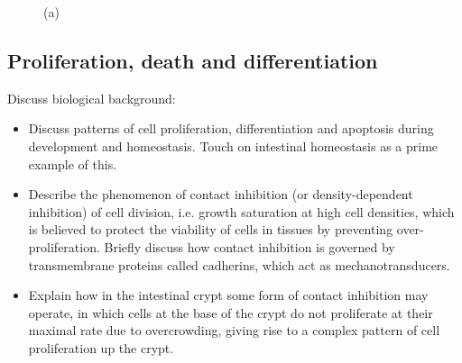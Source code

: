 \documentclass{article}
\begin{document}
\begin{figure}
{\label{fig:CellSorting:e}
}
\caption{(a)}
\label{fig:CellSorting}
\end{figure}


\subsection{Proliferation, death and differentiation} \label{sec:proliferation}

Discuss biological background:
\begin{itemize}
\item Discuss patterns of cell proliferation, differentiation and apoptosis during development and homeostasis. Touch on intestinal homeostasis as a prime example of this.
\item Describe the phenomenon of contact inhibition (or density-dependent inhibition) of cell division, i.e. growth saturation at high cell densities, which is believed to protect the viability of cells in tissues by preventing over-proliferation. Briefly discuss how contact inhibition is governed by transmembrane proteins called cadherins, which act as mechanotransducers.
\item Explain how in the intestinal crypt some form of contact inhibition may operate, in which cells at the base of the crypt do not proliferate at their maximal rate due to overcrowding, giving rise to a complex pattern of cell proliferation up the crypt.
\end{itemize}
\end{document}

